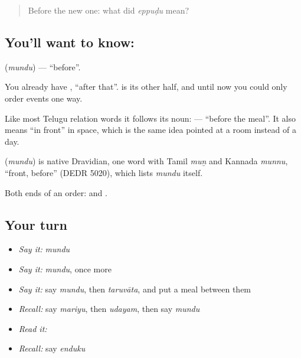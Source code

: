 \label{lesson:TE-C75-before}



\begin{quote}
Before the new one: what did \emph{eppuḍu} mean?
\end{quote}

\subsection*{You'll want to know: }
\textbf{} (\emph{mundu}) — \textquotedblleft{}before\textquotedblright{}.

You already have , \textquotedblleft{}after that\textquotedblright{}.  is its other half, and until now you could only order events one way.

Like most Telugu relation words it follows its noun: \textbf{ } — \textquotedblleft{}before the meal\textquotedblright{}. It also means \textquotedblleft{}in front\textquotedblright{} in space, which is the same idea pointed at a room instead of a day.

\begin{cousinweb}
\textbf{} (\emph{mundu}) is native Dravidian, one word with Tamil \emph{muṉ} and Kannada \emph{munnu}, \textquotedblleft{}front, before\textquotedblright{} (DEDR 5020), which lists \emph{mundu} itself.
\end{cousinweb}

\begin{grammarlens}[title={What you've built}]
Both ends of an order:  and .
\end{grammarlens}

\subsection*{Your turn}
\begin{itemize}
\raggedright
  \item \emph{Say it:} \emph{mundu}
  \item \emph{Say it:} \emph{mundu}, once more
  \item \emph{Say it:} say \emph{mundu}, then \emph{taruvāta}, and put a meal between them
  \item \emph{Recall:} say \emph{mariyu}, then \emph{udayam}, then say \emph{mundu}
  \item \emph{Read it:} \textbf{}
  \item \emph{Recall:} say \emph{enduku}
\end{itemize}

